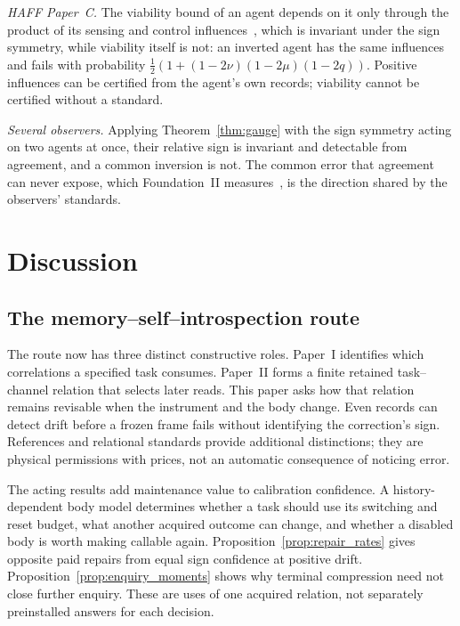 \documentclass[12pt]{article}
\theoremstyle{definition}
\begin{document}
\emph{HAFF Paper~C.} The viability bound of an agent depends on it only through the product of its sensing and control influences~\cite{Liu2026HAFF_C}, which is invariant under the sign symmetry, while viability itself is not: an inverted agent has the same influences and fails with probability $\tfrac12(1+(1-2\nu)(1-2\mu)(1-2q))$. Positive influences can be certified from the agent's own records; viability cannot be certified without a standard.

\emph{Several observers.} Applying Theorem~\ref{thm:gauge} with the sign symmetry acting on two agents at once, their relative sign is invariant and detectable from agreement, and a common inversion is not. The common error that agreement can never expose, which Foundation~II measures~\cite{Liu2026FII}, is the direction shared by the observers' standards.


\section{Discussion}
\label{sec:discussion}

\subsection{The memory--self--introspection route}
\label{subsec:logic_chain}

The route now has three distinct constructive roles.
Paper~I identifies which correlations a specified task consumes.
Paper~II forms a finite retained task--channel relation that selects
later reads. This paper asks how that relation remains revisable
when the instrument and the body change.
Even records can detect drift before a frozen frame fails without
identifying the correction's sign. References and relational standards
provide additional distinctions; they are physical permissions with
prices, not an automatic consequence of noticing error.

The acting results add maintenance value to calibration confidence.
A history-dependent body model determines whether a task should use
its switching and reset budget, what another acquired outcome can
change, and whether a disabled body is worth making callable again.
Proposition~\ref{prop:repair_rates} gives opposite paid repairs from
equal sign confidence at positive drift.
Proposition~\ref{prop:enquiry_moments} shows why terminal compression
need not close further enquiry.
These are uses of one acquired relation, not separately preinstalled
answers for each decision.
\end{document}
